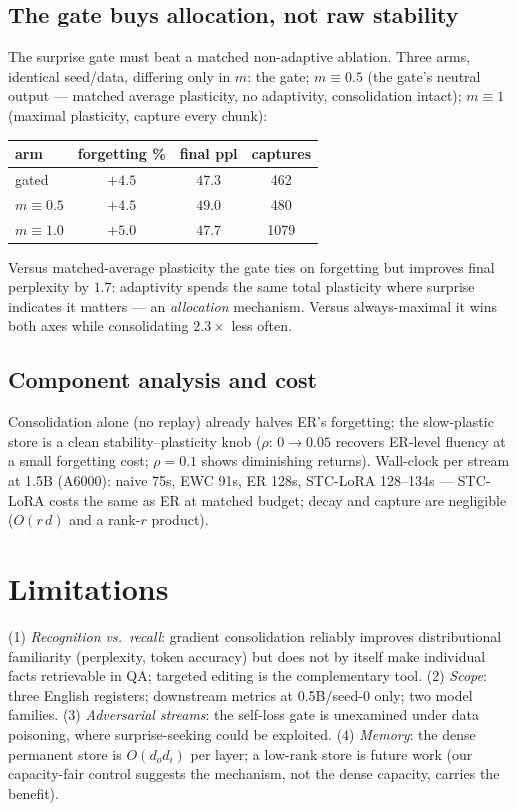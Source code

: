 \documentclass{article}
\newcommand{\stc}{STC-LoRA}
\newcommand{\best}[1]{\bm{#1}}   %
\begin{document}
\subsection{The gate buys allocation, not raw stability}
The surprise gate must beat a matched non-adaptive ablation. Three arms, identical seed/data, differing only in $m$: the gate; $m\equiv0.5$ (the gate's neutral output --- matched average plasticity, no adaptivity, consolidation intact); $m\equiv1$ (maximal plasticity, capture every chunk):
\begin{center}\small
\begin{tabular}{lccc}
\toprule
arm & forgetting \% & final ppl & captures \\
\midrule
gated & $\best{+4.5}$ & $\best{47.3}$ & 462 \\
$m\equiv0.5$ & $+4.5$ & $49.0$ & 480 \\
$m\equiv1.0$ & $+5.0$ & $47.7$ & 1079 \\
\bottomrule
\end{tabular}
\end{center}
Versus matched-average plasticity the gate ties on forgetting but improves final perplexity by $1.7$: adaptivity spends the same total plasticity where surprise indicates it matters --- an \emph{allocation} mechanism. Versus always-maximal it wins both axes while consolidating $2.3\times$ less often.

\subsection{Component analysis and cost}
Consolidation alone (no replay) already halves ER's forgetting; the slow-plastic store is a clean stability--plasticity knob ($\rho{:}\,0\rightarrow0.05$ recovers ER-level fluency at a small forgetting cost; $\rho{=}0.1$ shows diminishing returns). Wall-clock per stream at 1.5B (A6000): naive 75s, EWC 91s, ER 128s, \stc{} 128--134s --- \stc{} costs the same as ER at matched budget; decay and capture are negligible ($O(r\,d)$ and a rank-$r$ product).

\section{Limitations}
(1) \emph{Recognition vs.\ recall}: gradient consolidation reliably improves distributional familiarity (perplexity, token accuracy) but does not by itself make individual facts retrievable in QA; targeted editing \citep{meng2022locating} is the complementary tool. (2) \emph{Scope}: three English registers; downstream metrics at 0.5B/seed-0 only; two model families. (3) \emph{Adversarial streams}: the self-loss gate is unexamined under data poisoning, where surprise-seeking could be exploited. (4) \emph{Memory}: the dense permanent store is $O(d_o d_i)$ per layer; a low-rank store is future work (our capacity-fair control suggests the mechanism, not the dense capacity, carries the benefit).
\end{document}
